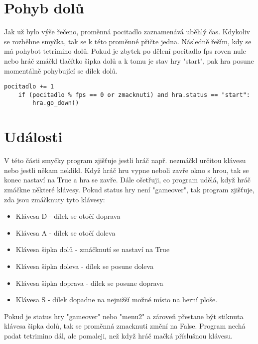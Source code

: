 \documentclass[12pt]{report}			%
\begin{document}
\section{Pohyb dolů}
Jak už bylo výše řečeno, proměnná pocitadlo zaznamenává uběhlý čas. Kdykoliv se rozběhne smyčka, tak se k této proměnné přičte jedna. 
Následně řeším, kdy se má pohybot tetrimino dolů. Pokud je zbytek po dělení pocitadlo fps roven nule nebo hráč zmáčkl tlačítko šipka dolů a k tomu je stav hry "start", pak hra posune momentálně pohybující se dílek dolů.
\begin{lstlisting}[title={Program tetris.py}, caption={Pohyb dolů}, 							label={lst:tetris.py}]
    pocitadlo += 1
    if (pocitadlo % fps == 0 or zmacknuti) and hra.status == "start":
        hra.go_down()
\end{lstlisting}
\section{Události}
V této části smyčky program zjišťuje jestli hráč např. nezmáčkl určitou klávesu nebo jestli někam neklikl. Když hráč hru vypne neboli zavře okno s hrou, tak se konec nastaví na True a hra se zavře.
Dále ošetřuji, co program udělá, když hráč zmáčkne některé klávesy.
Pokud status hry není "gameover", tak program zjišťuje, zda jsou zmáčknuty tyto klávesy:
\begin{itemize}
\item Klávesa D \-- dílek se otočí doprava
\item Klávesa A \-- dílek se otočí doleva
\item Klávesa šipka dolů \-- zmáčknutí se nastaví na True
\item Klávesa šipka doleva \-- dílek se posune doleva
\item Klávesa šipka doprava \-- dílek se posune doprava
\item Klávesa S \-- dílek dopadne na nejnižší možné místo na herní ploše.
\end{itemize}
Pokud je status hry "gameover" nebo "menu2" a zároveň přestane být stiknuta klávesa šipka dolů, tak se proměnná zmacknuti změní na False. Program nechá padat tetrimino dál, ale pomaleji, než když hráč mačká příslušnou klávesu.
\end{document}

